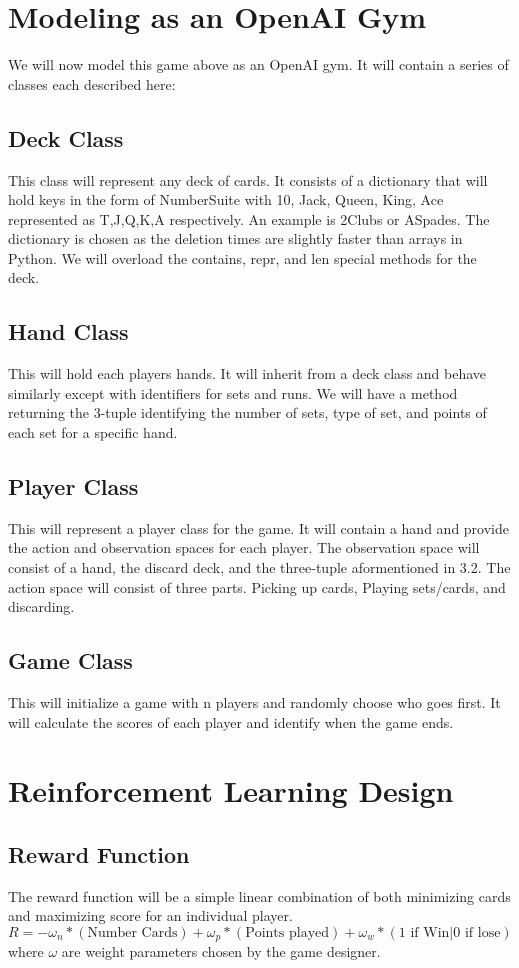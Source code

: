 \documentclass{article}
\begin{document}
\section{Modeling as an OpenAI Gym}
We will now model this game above as an OpenAI gym. It will contain a series of classes each described here:
\subsection{Deck Class}
This class will represent any deck of cards. It consists of a dictionary that will hold keys in the form of {Number}{Suite} with 10, Jack, Queen, King, Ace represented as T,J,Q,K,A respectively. An example is 2Clubs or ASpades. The dictionary is chosen as the deletion times are slightly faster than arrays in Python. We will overload the contains, repr, and len special methods for the deck.
\subsection{Hand Class}
This will hold each players hands. It will inherit from a deck class and behave similarly except with identifiers for sets and runs. We will have a method returning the 3-tuple identifying the number of sets, type of set, and points of each set for a specific hand.
\subsection{Player Class}
This will represent a player class for the game. It will contain a hand and provide the action and observation spaces for each player. The observation space will consist of a hand, the discard deck, and the three-tuple aformentioned in 3.2. The action space will consist of three parts. Picking up cards, Playing sets/cards, and discarding.
\subsection{Game Class}
This will initialize a game with n players and randomly choose who goes first. It will calculate the scores of each player and identify when the game ends. 
\section{Reinforcement Learning Design}
\subsection{Reward Function}
The reward function will be a simple linear combination of both minimizing cards and maximizing score for an individual player. 
\begin{equation}
R = -\omega_n * (\text{Number Cards}) + \omega_p * (\text{Points played}) + \omega_w * (\text{1 if Win}| \text{0 if lose})
\end{equation}
where $\omega$ are weight parameters chosen by the game designer.
\end{document}
